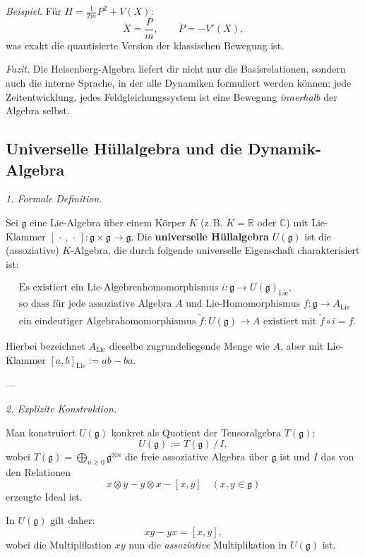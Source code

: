 \documentclass[10pt, letterpaper]{article}
\newcommand{\R}{\mathbb{R}}
\newcommand{\C}{\mathbb{C}}
\begin{document}
\emph{Beispiel.}
Für \(H=\frac{1}{2m}P^2+V(X)\):
\[
\dot{X} = \frac{P}{m},\qquad
\dot{P} = -V'(X),
\]
was exakt die quantisierte Version der klassischen Bewegung ist.

\emph{Fazit.}
Die Heisenberg-Algebra liefert dir nicht nur die Basisrelationen,
sondern auch die interne Sprache, in der alle Dynamiken formuliert werden können:
jede Zeitentwicklung, jedes Feldgleichungssystem
ist eine Bewegung \emph{innerhalb} der Algebra selbst.



\subsection{Universelle Hüllalgebra und die Dynamik-Algebra}

\emph{1. Formale Definition.}

Sei \(\mathfrak{g}\) eine Lie-Algebra über einem Körper \(K\) (z.\,B. \(K=\R\) oder \(\C\)) mit Lie-Klammer
\([\,\cdot\,,\,\cdot\,]:\mathfrak{g}\times\mathfrak{g}\to\mathfrak{g}\).
Die \textbf{universelle Hüllalgebra} \(U(\mathfrak{g})\) ist die (assoziative) \(K\)-Algebra,
die durch folgende universelle Eigenschaft charakterisiert ist:

\[
\boxed{
\begin{aligned}
&\text{Es existiert ein Lie-Algebrenhomomorphismus } i:\mathfrak{g}\to U(\mathfrak{g})_{\mathrm{Lie}},\\
&\text{so dass für jede assoziative Algebra } A \text{ und Lie-Homomorphismus } f:\mathfrak{g}\to A_{\mathrm{Lie}}\\
&\text{ein eindeutiger Algebrahomomorphismus } \tilde{f}:U(\mathfrak{g})\to A \text{ existiert mit } \tilde{f}\circ i=f.
\end{aligned}
}
\]

Hierbei bezeichnet \(A_{\mathrm{Lie}}\) dieselbe zugrundeliegende Menge wie \(A\),
aber mit Lie-Klammer \([a,b]_{\mathrm{Lie}}:=ab-ba\).

---

\emph{2. Explizite Konstruktion.}

Man konstruiert \(U(\mathfrak{g})\) konkret als Quotient der Tensoralgebra \(T(\mathfrak{g})\):
\[
U(\mathfrak{g})
:= T(\mathfrak{g})\,\big/\,I,
\]
wobei \(T(\mathfrak{g})=\bigoplus_{n\ge0}\mathfrak{g}^{\otimes n}\)
die freie assoziative Algebra über \(\mathfrak{g}\) ist
und \(I\) das von den Relationen
\[
x\otimes y - y\otimes x - [x,y]\quad (x,y\in\mathfrak{g})
\]
erzeugte Ideal ist.

In \(U(\mathfrak{g})\) gilt daher:
\[
xy - yx = [x,y],
\]
wobei die Multiplikation \(xy\) nun die \emph{assoziative} Multiplikation in \(U(\mathfrak{g})\) ist.
\end{document}
